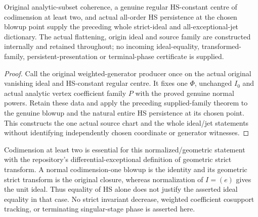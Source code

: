 \begin{theorem}
\label{hir:actual-original-persistent-strict-ideal-jets}
\leanok
Original analytic-subset coherence, a genuine regular HS-constant centre of codimension at least two, and actual all-order HS persistence at the chosen blowup point supply the preceding whole strict-ideal and all-exceptional-jet dictionary.
The actual flattening, origin ideal and source family are constructed internally and retained throughout; no incoming ideal-equality, transformed-family, persistent-presentation or terminal-phase certificate is supplied.
\end{theorem}
\begin{proof}
Call the original weighted-generator producer once on the actual original vanishing ideal and HS-constant regular centre.
It fixes one $\Phi$, unchanged $I_0$ and actual analytic vertex coefficient family $P$ with the proved genuine normal powers.
Retain these data and apply the preceding supplied-family theorem to the genuine blowup and the natural entire HS persistence at its chosen point.
This constructs the one actual source chart and the whole ideal/jet statements without identifying independently chosen coordinate or generator witnesses.
\end{proof}

\begin{remark}
Codimension at least two is essential for this normalized/geometric statement with the repository's differential-exceptional definition of geometric strict transform. A normal codimension-one blowup is the identity and its geometric strict transform is the original closure, whereas normalization of $I=(e)$ gives the unit ideal. Thus equality of HS alone does not justify the asserted ideal equality in that case. No strict invariant decrease, weighted coefficient cosupport tracking, or terminating singular-stage phase is asserted here.
\end{remark}
